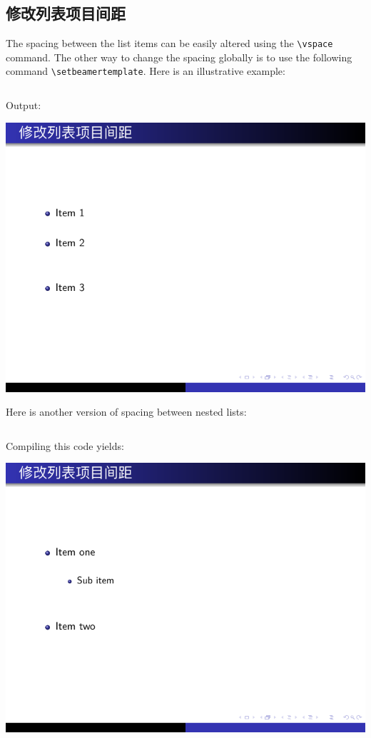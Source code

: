 \subsection{修改列表项目间距}

The spacing between the list items can be easily altered using the \verb|\vspace| command. The other way to change the spacing globally is to use the following command \verb|\setbeamertemplate|. Here is an illustrative example:

\inputminted[linenos=true]{latex}{examples/beamer/list-item-space1.tex}

Output:

\includegraphics{examples/beamer/list-item-space1.pdf}

Here is another version of spacing between nested lists:

\inputminted[linenos=true]{latex}{examples/beamer/list-item-space2.tex}

Compiling this code yields:

\includegraphics{examples/beamer/list-item-space2.pdf}

